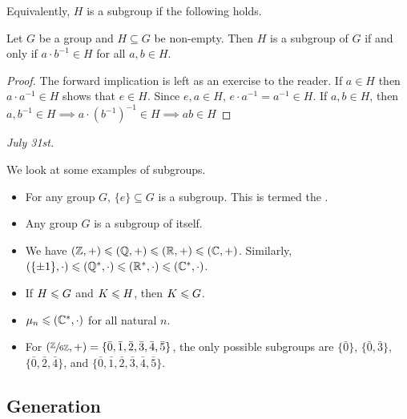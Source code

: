 Equivalently, $H$ is a subgroup if the following holds.

\begin{theorem}
    Let $G$ be a group and $H \subseteq G$ be non-empty. Then $H$ is a subgroup of $G$ if and only if $a \cdot b^{-1} \in H$ for all $a,b \in H$.
\end{theorem}
\begin{proof}
    The forward implication is left as an exercise to the reader. If $a \in H$ then $a \cdot a^{-1} \in H$ shows that $e \in H$. Since $e,a \in H$, $e \cdot a^{-1} = a^{-1} \in H$. If $a,b \in H$, then $a,b^{-1} \in H \implies a \cdot (b^{-1})^{-1} \in H \implies ab \in H$
\end{proof}

\noindent \textit{July 31st.}

We look at some examples of subgroups.

\begin{example}
    \begin{itemize}
        \item For any group $G$, $\{e\} \subseteq G$ is a subgroup. This is termed the .
        
        \item Any group $G$ is a subgroup of itself.
        
        \item We have $(\mathbb{Z},+) \leqslant (\mathbb{Q},+) \leqslant (\mathbb{R},+) \leqslant (\mathbb{C},+)$. Similarly, $(\{\pm 1\},\cdot) \leqslant (\mathbb{Q}^{\ast},\cdot) \leqslant (\mathbb{R}^{\ast},\cdot) \leqslant (\mathbb{C}^{\ast}, \cdot)$.
        
        \item If $H \leqslant G$ and $K \leqslant H$, then $K \leqslant G$.
        
        \item $\mu_{n} \leqslant (\mathbb{C}^{\ast},\cdot)$ for all natural $n$.
        
        \item For $(\sfrac{\mathbb{Z}}{6\mathbb{Z}}, +) = \{\bar{0},\bar{1},\bar{2},\bar{3},\bar{4},\bar{5}\}$, the only possible subgroups are $\{\bar{0}\}$, $\{\bar{0},\bar{3}\}$, $\{\bar{0},\bar{2},\bar{4}\}$, and $\{\bar{0},\bar{1},\bar{2},\bar{3},\bar{4},\bar{5}\}$.
    \end{itemize}
\end{example}

\subsection{Generation}

